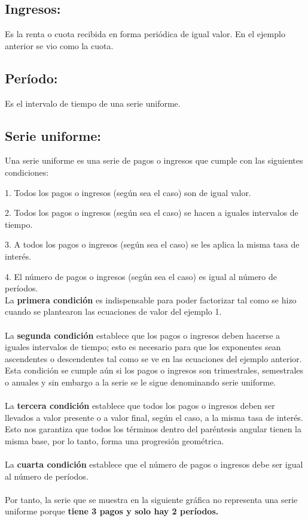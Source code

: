 


	\subsection{Ingresos:}Es la renta o cuota recibida en forma periódica de igual valor. En el ejemplo anterior se vio como la cuota.

	\subsection{Período:}
	Es el intervalo de tiempo de una serie uniforme.

	\subsection{Serie uniforme:}
	Una serie uniforme es una serie de pagos o ingresos que cumple con las siguientes condiciones:


	\hspace{35pt}	1. Todos los pagos o ingresos (según sea el caso) son de igual valor.

	\hspace{35pt} 2. Todos los pagos o ingresos (según sea el caso) se hacen a iguales intervalos de tiempo.

	\hspace{35pt} 3. A todos los pagos o ingresos (según sea el caso) se les aplica la misma tasa de interés.

	\hspace{35pt}	4. El número de pagos o ingresos (según sea el caso) es igual al número de períodos.
	\\

	La \textbf{primera condición} es indispensable para poder factorizar tal como se hizo cuando se plantearon las ecuaciones de valor del ejemplo 1.
	\\\\
	La \textbf{segunda condición} establece que los pagos o ingresos deben hacerse a iguales intervalos de tiempo; esto es necesario para que los exponentes sean ascendentes o descendentes tal como se ve en las ecuaciones del ejemplo anterior. Esta condición se cumple aún si los pagos o ingresos son trimestrales, semestrales o anuales y sin embargo a la serie se le sigue denominando serie uniforme.
	\\\\
	La \textbf{tercera condición} establece que todos los pagos o ingresos deben ser llevados a valor presente o a valor final, según el caso, a la misma tasa de interés. Esto nos garantiza que todos los términos dentro del paréntesis angular tienen la misma base, por lo tanto, forma una progresión geométrica.
	\\\\
	La \textbf{cuarta condición} establece que el número de pagos o ingresos debe ser igual al número de períodos.
	\\\\
	Por tanto, la serie que se muestra en la siguiente gráfica no representa una serie uniforme porque \textbf{tiene 3 pagos y solo hay 2 períodos.}

